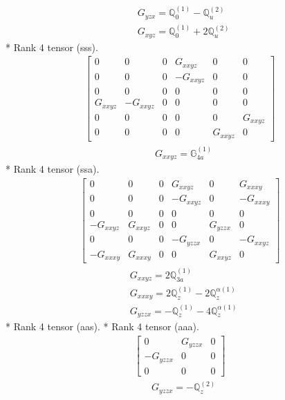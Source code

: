 \documentclass[fleqn,8pt,landscape]{jsarticle}
\begin{document}
\begin{align*}
& G_{yzx} = \mathbb{Q}_{0}^{(1)} - \mathbb{Q}_{u}^{(2)} \\
& G_{xyz} = \mathbb{Q}_{0}^{(1)} + 2 \mathbb{Q}_{u}^{(2)}
\end{align*}
* Rank 4 tensor (sss).
\begin{align*}
\begin{bmatrix} 0 & 0 & 0 & G_{xxyz} & 0 & 0 \\ 0 & 0 & 0 & - G_{xxyz} & 0 & 0 \\ 0 & 0 & 0 & 0 & 0 & 0 \\ G_{xxyz} & - G_{xxyz} & 0 & 0 & 0 & 0 \\ 0 & 0 & 0 & 0 & 0 & G_{xxyz} \\ 0 & 0 & 0 & 0 & G_{xxyz} & 0 \end{bmatrix}
\end{align*}
\begin{align*}
& G_{xxyz} = \mathbb{G}_{4a}^{(1)}
\end{align*}
* Rank 4 tensor (ssa).
\begin{align*}
\begin{bmatrix} 0 & 0 & 0 & G_{xxyz} & 0 & G_{xxxy} \\ 0 & 0 & 0 & - G_{xxyz} & 0 & - G_{xxxy} \\ 0 & 0 & 0 & 0 & 0 & 0 \\ - G_{xxyz} & G_{xxyz} & 0 & 0 & G_{yzzx} & 0 \\ 0 & 0 & 0 & - G_{yzzx} & 0 & - G_{xxyz} \\ - G_{xxxy} & G_{xxxy} & 0 & 0 & G_{xxyz} & 0 \end{bmatrix}
\end{align*}
\begin{align*}
& G_{xxyz} = 2 \mathbb{Q}_{3a}^{(1)} \\
& G_{xxxy} = 2 \mathbb{Q}_{z}^{(1)} - 2 \mathbb{Q}_{z}^{\alpha(1)} \\
& G_{yzzx} = - \mathbb{Q}_{z}^{(1)} - 4 \mathbb{Q}_{z}^{\alpha(1)}
\end{align*}
* Rank 4 tensor (aas).
* Rank 4 tensor (aaa).
\begin{align*}
\begin{bmatrix} 0 & G_{yzzx} & 0 \\ - G_{yzzx} & 0 & 0 \\ 0 & 0 & 0 \end{bmatrix}
\end{align*}
\begin{align*}
& G_{yzzx} = - \mathbb{Q}_{z}^{(2)}
\end{align*}
\end{document}
